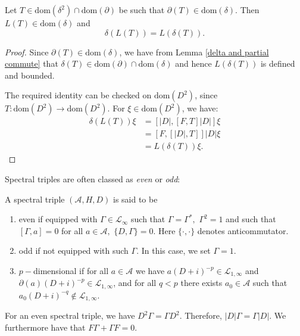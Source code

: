     \begin{lem}
        Let $T\in \mathrm{dom}(\delta^2)\cap \mathrm{dom}(\partial)$ be such that $\partial(T) \in \mathrm{dom}(\delta)$. Then $L(T) \in \mathrm{dom}(\delta)$ and
        \begin{equation*}
            \delta(L(T)) = L(\delta(T)).
        \end{equation*}
    \end{lem}
    \begin{proof}
        Since $\partial(T) \in \mathrm{dom}(\delta)$, we have from Lemma \ref{delta and partial commute} that $\delta(T) \in \mathrm{dom}(\partial)\cap \mathrm{dom}(\delta)$ and hence $L(\delta(T))$ is defined and bounded.
    
        The required identity can be checked on $\mathrm{dom}(D^2)$, since $T:\mathrm{dom}(D^2)\to \mathrm{dom}(D^2)$. 
        For $\xi \in \mathrm{dom}(D^2)$, we have:
        \begin{align*}
            \delta(L(T))\xi &= [|D|,[F,T]|D|]\xi\\
                            &= [F,[|D|,T]]|D|\xi\\
                            &= L(\delta(T))\xi.
        \end{align*}
    \end{proof}
    
    Spectral triples are often classed as \emph{even} or \emph{odd}:
    \begin{defi}\label{oddeven} 
        A spectral triple $(\mathcal{A},H,D)$ is said to be
        \begin{enumerate}[{\rm (a)}]
        \item even if equipped with $\Gamma\in\mathcal{L}_{\infty}$ such that $\Gamma=\Gamma^*,$ $\Gamma^2=1$ and such that $[\Gamma,a]=0$ for all $a\in\mathcal{A},$ $\{D,\Gamma\}=0.$ Here $\{\cdot,\cdot\}$ denotes anticommutator.
        \item odd if not equipped with such $\Gamma.$ In this case, we set $\Gamma=1.$
        \item $p-$dimensional if for all $a \in \mathcal{A}$ we have $a(D+i)^{-p} \in \mathcal{L}_{1,\infty}$ and $\partial(a)(D+i)^{-p}\in\mathcal{L}_{1,\infty}$, and for all $q < p$ there exists $a_0\in \mathcal{A}$ such that $a_0(D+i)^{-q}\notin\mathcal{L}_{1,\infty}$.
        \end{enumerate}
    \end{defi}
    For an even spectral triple, we have $D^2\Gamma=\Gamma D^2.$ Therefore, $|D|\Gamma=\Gamma|D|$. We furthermore have that $F\Gamma+\Gamma F = 0$.
    
